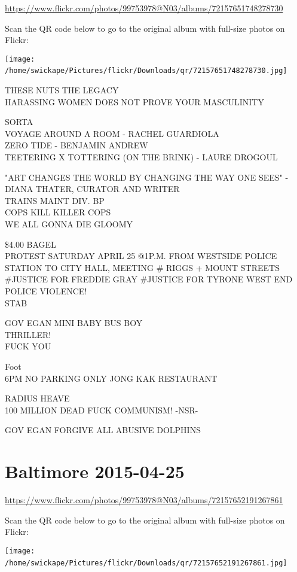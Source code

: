 \documentclass[10pt,letterpaper]{article}
\begin{document}
\url{https://www.flickr.com/photos/99753978@N03/albums/72157651748278730}

Scan the QR code below to go to the original album with full-size photos on Flickr:

\texttt{[image: /home/swickape/Pictures/flickr/Downloads/qr/72157651748278730.jpg]}
\

THESE NUTS THE LEGACY\\
HARASSING WOMEN DOES NOT PROVE YOUR MASCULINITY

SORTA\\
VOYAGE AROUND A ROOM {-} RACHEL GUARDIOLA\\
ZERO TIDE {-} BENJAMIN ANDREW\\
TEETERING X TOTTERING (ON THE BRINK) {-} LAURE DROGOUL

"ART CHANGES THE WORLD BY CHANGING THE WAY ONE SEES" {-} DIANA THATER, CURATOR AND WRITER\\
TRAINS MAINT DIV. BP\\
COPS KILL KILLER COPS\\
WE ALL GONNA DIE GLOOMY

\$4.00 BAGEL\\
PROTEST SATURDAY APRIL 25 @1P.M. FROM WESTSIDE POLICE STATION TO CITY HALL, MEETING \# RIGGS + MOUNT STREETS\\
\#JUSTICE FOR FREDDIE GRAY \#JUSTICE FOR TYRONE WEST END POLICE VIOLENCE!\\
STAB

GOV EGAN MINI BABY BUS BOY\\
THRILLER!\\
FUCK YOU

Foot\\
6PM NO PARKING ONLY JONG KAK RESTAURANT

RADIUS HEAVE\\
100 MILLION DEAD FUCK COMMUNISM!  {-}NSR{-}

GOV EGAN FORGIVE ALL ABUSIVE DOLPHINS
\

\section*{Baltimore 2015-04-25}

\url{https://www.flickr.com/photos/99753978@N03/albums/72157652191267861}

Scan the QR code below to go to the original album with full-size photos on Flickr:

\texttt{[image: /home/swickape/Pictures/flickr/Downloads/qr/72157652191267861.jpg]}
\
\end{document}
